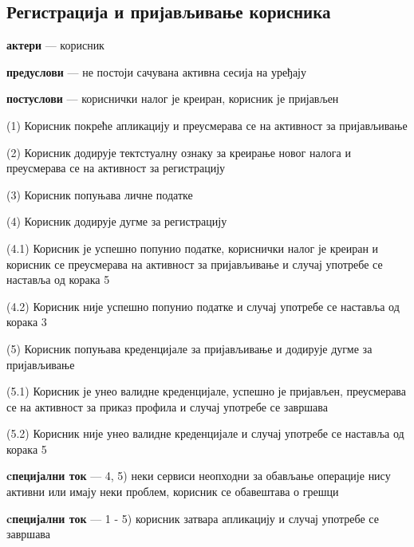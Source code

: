\documentclass[12pt,oneside]{memoir}
\begin{document}
\subsection{Регистрација и пријављивање корисника}
\begin{description}
    \item \textbf{актери} --- корисник
    \item \textbf{предуслови} --- не постоји сачувана активна сесија на уређају
    \item \textbf{постуслови} ---  кориснички налог је креиран, корисник је пријављен
    \item (1) Корисник покреће апликацију и преусмерава се на активност за пријављивање
    \item (2) Корисник додирује тектстуалну ознаку за креирање новог налога и преусмерава се на активност за регистрацију
    \item (3) Корисник попуњава личне податке
    \item (4) Корисник додирује дугме за регистрацију
    \begin{description}
        \item (4.1) Корисник је успешно попунио податке, кориснички налог је креиран и корисник се преусмерава на активност за пријављивање и случај употребе се наставља од корака 5
        \item (4.2) Корисник није успешно попунио податке и случај употребе се наставља од корака 3
    \end{description}
    \item (5) Корисник попуњава креденцијале за пријављивање и додирује дугме за пријављивање
    \begin{description}
        \item (5.1) Корисник је унео валидне креденцијале, успешно је пријављен, преусмерава се на активност за приказ профила и случај употребе се завршава
        \item (5.2) Корисник није унео валидне креденцијале и случај употребе се наставља од корака 5
    \end{description}
    \item \textbf{cпецијални ток} --- 4, 5) неки сервиси неопходни за обављање операције нису активни или имају неки проблем, корисник се обавештава о грешци
    \item \textbf{cпецијални ток} --- 1 - 5) корисник затвара апликацију и случај употребе се завршава 
\end{description}
\end{document}
